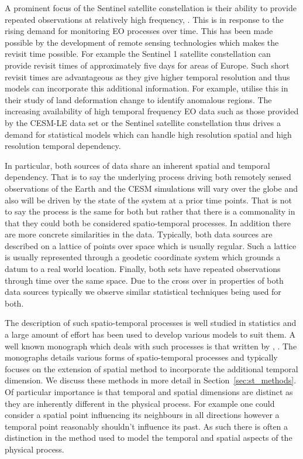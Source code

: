 A prominent focus of the Sentinel satellite constellation is their ability to provide repeated observations at relatively high frequency, \cite{aschbacher_european_2012}.
This is in response to the rising demand for monitoring EO processes over time.
This has been made possible by the development of remote sensing technologies which makes the revisit time possible.
For example the Sentinel 1 satellite constellation can provide revisit times of approximately five days for areas of Europe. Such short revisit times are advantageous as they give higher temporal resolution and thus models can incorporate this additional information.
For example, \citeauthor{raspini_continuous_2018} utilise this in their study of land deformation change to identify anomalous regions.
The increasing availability of high temporal frequency EO data such as those provided by the CESM-LE data set or the Sentinel satellite constellation thus drives a demand for statistical models which can handle high resolution spatial and high resolution temporal  dependency.  

In particular, both sources of data share an inherent spatial and temporal dependency.
That is to say the underlying process driving both remotely sensed observations of the Earth and the CESM simulations will vary over the globe and also will be driven by the state of the system at a prior time points.
That is not to say the process is the same for both but rather that there is a commonality in that they could both be considered spatio-temporal processes.
In addition there are more concrete similarities in the data.
Typically, both data sources are described on a lattice of points over space which is usually regular.
Such a lattice is usually represented through a geodetic coordinate system which grounds a datum to a real world location.
Finally, both sets have repeated observations through time over the same space.
Due to the cross over in properties of both data sources typically we observe similar statistical techniques being used for both. 

The description of such spatio-temporal processes is well studied in statistics and a large amount of effort has been used to develop various models to suit them.
A well known monograph which deals with such processes is that written by \citeauthor{cressie_statistics_2011}, \cite{cressie_statistics_2011}.
The monographs details various forms of spatio-temporal processes and typically focuses on the extension of spatial method to incorporate the additional temporal dimension.
We discuss these methods in more detail in Section~\ref{sec:st_methods}.
Of particular importance is that temporal and spatial dimensions are distinct as they are inherently different in the physical process.
For example one could consider a spatial point influencing its neighbours in all directions however a temporal point reasonably shouldn't influence its past.
As such there is often a distinction in the method used to model the temporal and spatial aspects of the physical process.

